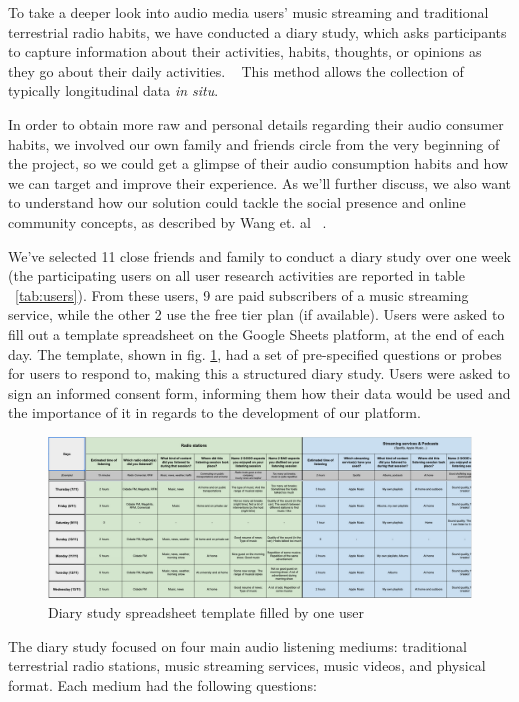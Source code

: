 To take a deeper look into audio media users' music streaming and traditional terrestrial radio habits, we have conducted a diary study, which asks participants to capture information about their activities, habits, thoughts, or opinions as they go about their daily activities. ~\cite{Courage2005} This method allows the collection of typically longitudinal data \textit{in situ}. 

In order to obtain more raw and personal details regarding their audio consumer habits, we involved our own family and friends circle from the very beginning of the project, so we could get a glimpse of their audio consumption habits and how we can target and improve their experience. As we'll further discuss, we also want to understand how our solution could tackle the social presence and online community concepts, as described by Wang et. al ~\cite{Wang2014}.

We've selected 11 close friends and family to conduct a diary study over one week (the participating users on all user research activities are reported in table ~\ref{tab:users}). From these users, 9 are paid subscribers of a music streaming service, while the other 2 use the free tier plan (if available). Users were asked to fill out a template spreadsheet on the Google Sheets platform, at the end of each day. The template, shown in fig. \ref{fig:diarystudy}, had a set of pre-specified questions or probes for users to respond to, making this a structured diary study. Users were asked to sign an informed consent form, informing them how their data would be used and the importance of it in regards to the development of our platform.

\begin{figure}[!h]
    \centering
    \includegraphics[width=\columnwidth]{./Images/diarystudy.png}
    \caption{Diary study spreadsheet template filled by one user}
    \label{fig:diarystudy}
\end{figure}

The diary study focused on four main audio listening mediums: traditional terrestrial radio stations, music streaming services, music videos, and physical format. Each medium had the following questions:


